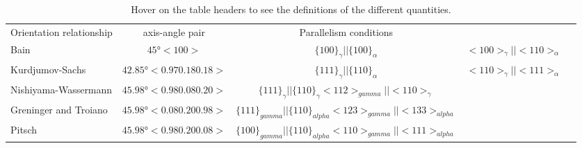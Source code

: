 
\begin{table*}
\caption{Hover on the table headers to see the definitions of the  different quantities.}
\label{table}
\begin{tabular}{l c | c c c }
\hline\hline
    Orientation relationship & axis-angle pair & Parallelism conditions \\
    Bain \cite{bain1924nature} & $45°<100>$ & $\{100\}_{\gamma}||\{100\}_{\alpha}$ & $<100>_{\gamma}||<110>_{\alpha}$ \\
    Kurdjumov-Sachs \cite{kurdjumow1930mechanismus} & $42.85°<0.97 0.180.18>$ & $\{111\}_{\gamma}||\{110\}_{\alpha}$ & $<110>_{\gamma}||<111>_{\alpha}$ \\
    Nishiyama-Wassermann \cite{nishiyama1934x,wassermann1935ueber} & $45.98° <0.98 0.08 0.20>$ & $\{111\}_{\gamma} || \{110\}_{\gamma} <112>_{gamma} || <110>_{\gamma}$ \\
    Greninger and Troiano \cite{greninger1949mechanism} & $45.98° <0.08 0.20 0.98>$ & $\{111\}_{gamma} || \{110\}_{alpha} <123>_{gamma} || <133>_{alpha}$ \\
    Pitsch \cite{pitsch1962orientierungszusammenhang} & $45.98° <0.98 0.20 0.08>$ & $\{100\}_{gamma} || \{110\}_{alpha} <110>_{gamma} || <111>_{alpha}$ \\
\hline
\end{tabular}
\end{table*}
